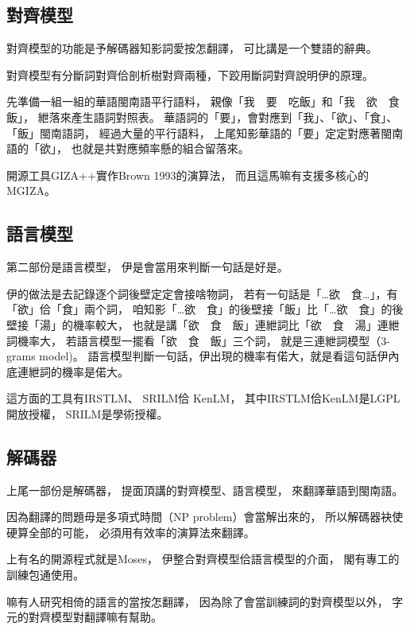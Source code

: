 \subsection{對齊模型}
\label{小節：對齊模型}
對齊模型的功能是予解碼器知影詞愛按怎翻譯，
可比講是一个雙語的辭典。

對齊模型有分斷詞對齊佮剖析樹對齊兩種，下跤用斷詞對齊說明伊的原理。

先準備一組一組的華語閩南語平行語料，
親像「我　要　吃飯」和「我　欲　食　飯」，
紲落來產生語詞對照表。
華語詞的「要」，會對應到「我」、「欲」、「食」、「飯」閩南語詞，
經過大量的平行語料，
上尾知影華語的「要」定定對應著閩南語的「欲」，
也就是共對應頻率懸的組合留落來。

開源工具GIZA++\cite{och2003systematic}實作Brown 1993的演算法，
而且這馬嘛有支援多核心的MGIZA\cite{gao2008parallel}。

\subsection{語言模型}
\label{小節：語言模型}
第二部份是語言模型，
伊是會當用來判斷一句話是好是。

伊的做法是去記錄逐个詞後壁定定會接啥物詞，
若有一句話是「…欲　食…」，有「欲」佮「食」兩个詞，
咱知影「…欲　食」的後壁接「飯」比「…欲　食」的後壁接「湯」的機率較大，
也就是講「欲　食　飯」連紲詞比「欲　食　湯」連紲詞機率大，
若語言模型一擺看「欲　食　飯」三个詞，
就是三連紲詞模型（3-grams model)。
語言模型判斷一句話，伊出現的機率有偌大，就是看這句話伊內底連紲詞的機率是偌大。

這方面的工具有IRSTLM\cite{federico2008irstlm}、
SRILM\cite{stolcke2002srilm}佮
KenLM\cite{Heafield-estimate}，
其中IRSTLM佮KenLM是LGPL開放授權，
SRILM是學術授權。

\subsection{解碼器}
\label{小節：解碼器}
上尾一部份是解碼器，
提面頂講的對齊模型、語言模型，
來翻譯華語到閩南語。

因為翻譯的問題毋是多項式時間（NP problem）會當解出來的，
所以解碼器袂使硬算全部的可能，
必須用有效率的演算法來翻譯。

上有名的開源程式就是Moses\cite{Koehn:2007:MOS:1557769.1557821}，
伊整合對齊模型佮語言模型的介面，
閣有專工的訓練包通使用\cite{Moses訓練包}。

嘛有人研究相倚的語言的當按怎翻譯\cite{nakov2012combining}，
因為除了會當訓練詞的對齊模型以外，
字元的對齊模型對翻譯嘛有幫助。

